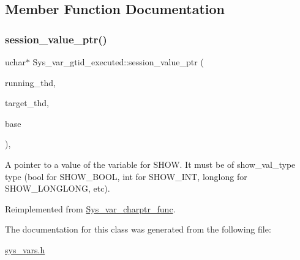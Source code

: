 \subsection{Member Function Documentation}
\mbox{\label{classSys__var__gtid__executed_a0dda7c15486b8024efc6feb4146b6b7e}} 
\subsubsection{\texorpdfstring{session\+\_\+value\+\_\+ptr()}{session\_value\_ptr()}}
{\footnotesize\ttfamily uchar$\ast$ Sys\+\_\+var\+\_\+gtid\+\_\+executed\+::session\+\_\+value\+\_\+ptr (\begin{DoxyParamCaption}\item[{T\+HD $\ast$}]{running\+\_\+thd,  }\item[{T\+HD $\ast$}]{target\+\_\+thd,  }\item[{L\+E\+X\+\_\+\+S\+T\+R\+I\+NG $\ast$}]{base }\end{DoxyParamCaption})\hspace{0.3cm}{\ttfamily [inline]}, {\ttfamily [virtual]}}

A pointer to a value of the variable for S\+H\+OW. It must be of show\+\_\+val\+\_\+type type (bool for S\+H\+O\+W\+\_\+\+B\+O\+OL, int for S\+H\+O\+W\+\_\+\+I\+NT, longlong for S\+H\+O\+W\+\_\+\+L\+O\+N\+G\+L\+O\+NG, etc). 

Reimplemented from \mbox{\hyperlink{classSys__var__charptr__func_a80990cda2c596f6dc20e9b63a2a3cb4b}{Sys\+\_\+var\+\_\+charptr\+\_\+func}}.



The documentation for this class was generated from the following file\+:\begin{DoxyCompactItemize}
\item 
\mbox{\hyperlink{sys__vars_8h}{sys\+\_\+vars.\+h}}\end{DoxyCompactItemize}
